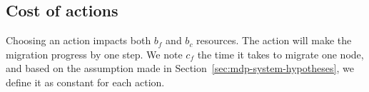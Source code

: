 




\subsection{Cost of actions}
Choosing an action impacts both $b_f$ and $b_c$ resources. The action will make the migration progress by one step.
We note $c_f$ the time it takes to migrate one node, and based on the assumption made in Section~\ref{sec:mdp-system-hypotheses}, we define it as constant for each action.

